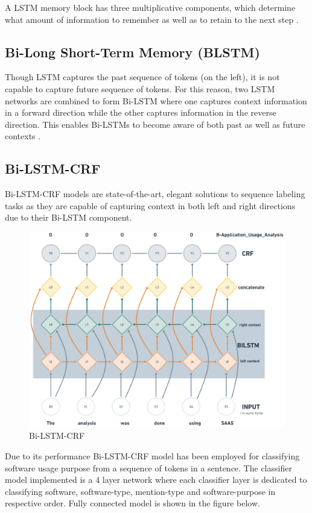 A LSTM memory block has three multiplicative components, which determine what amount of information to remember as well as to retain to the next step \citep{ma2016end}. 


\subsection{Bi-Long Short-Term Memory (BLSTM)}
\label{sec:chapter05:DLModels:BiLSTM}

Though LSTM captures the past sequence of tokens (on the left), it is not capable to capture future sequence of tokens. For this reason, two LSTM networks are combined to form Bi-LSTM where one captures context information in a forward direction while the other captures information in the reverse direction. This enables Bi-LSTMs to become aware of both past as well as future contexts \citep{ma2016end}. 

\subsection{Bi-LSTM-CRF}
\label{sec:chapter05:DLModels:BiLSTMCRF}

Bi-LSTM-CRF models are state-of-the-art, elegant solutions to sequence labeling tasks as they are capable of capturing context in both left and right directions due to their Bi-LSTM component. 

\begin{figure}[htbp]
	\centering
	\includegraphics[width=.70\textwidth]{4.graphics/figures/models/pdf/Bi-LSTM-CRF}
	\caption{Bi-LSTM-CRF }
	\label{fig:chapter03:setup}
\end{figure}

Due to its performance Bi-LSTM-CRF model has been employed for classifying software usage purpose from a sequence of tokens in a sentence. The classifier model implemented is a 4 layer network where each classifier layer is dedicated to classifying software, software-type, mention-type and software-purpose in respective order. Fully connected model is shown in the figure below. 

